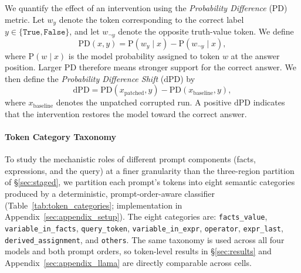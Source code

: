 \documentclass[11pt]{article}
\begin{document}
\noindent We quantify the effect of an intervention using the \textit{Probability Difference} (PD) metric. Let $w_y$ denote the token corresponding to the correct label $y \in \{\texttt{True}, \texttt{False}\}$, and let $w_{\neg y}$ denote the opposite truth-value token. We define
\begin{equation}
    \mathrm{PD}(x, y) = \mathrm{P}(w_y \mid x) - \mathrm{P}(w_{\neg y} \mid x),
    \label{eq:logit_diff}
\end{equation}
where $\mathrm{P}(w \mid x)$ is the model probability assigned to token $w$ at the answer position. Larger PD therefore means stronger support for the correct answer. We then define the \textit{Probability Difference Shift} ($\mathrm{dPD}$) by
\begin{equation}
    \mathrm{dPD} = \mathrm{PD}(x_{\text{patched}}, y) - \mathrm{PD}(x_{\text{baseline}}, y),
    \label{eq:dld}
\end{equation}
where $x_{\text{baseline}}$ denotes the unpatched corrupted run. A positive $\mathrm{dPD}$ indicates that the intervention restores the model toward the correct answer.

\paragraph{Token Category Taxonomy}
To study the mechanistic roles of different prompt components (facts, expressions, and the query) at a finer granularity than the three-region partition of §\ref{sec:staged}, we partition each prompt's tokens into eight semantic categories produced by a deterministic, prompt-order-aware classifier (Table~\ref{tab:token_categories}; implementation in Appendix~\ref{sec:appendix_setup}). The eight categories are: \texttt{facts\_value}, \texttt{variable\_in\_facts}, \texttt{query\_token}, \texttt{variable\_in\_expr}, \texttt{operator}, \texttt{expr\_last}, \texttt{derived\_assignment}, and \texttt{others}. The same taxonomy is used across all four models and both prompt orders, so token-level results in \S\ref{sec:results} and Appendix~\ref{sec:appendix_llama} are directly comparable across cells.
\end{document}
